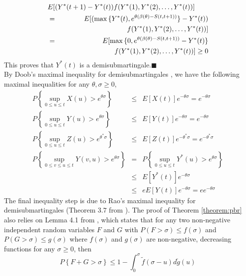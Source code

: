 \documentclass[letterpaper]{IEEEtran}
\begin{document}
\small 
\begin{eqnarray*}
\lefteqn{E[(Y^*(t+1) - Y^*(t))f(Y^*(1), Y^*(2), \ldots, Y^*(t))]} \\
&=& E[(\max{\{Y^*(t),e^{\theta (\beta(\theta) - S(t,t+1))}\}} - Y^*(t))\\
&& \ \ \ \ \ \ \ \ \ \ \ \ \ \ \ \ \ \ \ \ \ \ \ \ \ \ \ \ f(Y^*(1), Y^*(2), \ldots, Y^*(t))]\\
&=& E[\max{\{0,e^{\theta (\beta(\theta) - S(t,t+1))}-Y^*(t)\}} \\
&&  \ \ \ \ \ \ \ \ \ \ \ \ \ \ \ \ \ \ \ \ \ \ \ f(Y^*(1), Y^*(2), \ldots, Y^*(t))] \ge 0
\end{eqnarray*}
\normalsize
This proves that $Y^*(t)$ is a demisubmartingale.$\blacksquare$\\
By Doob's maximal inequality for demisubmartingales \cite{chris:2003,rao:2007}, we have the following maximal inequalities for any $\theta, \sigma \ge 0$,
\small
\begin{eqnarray}
P\left\{ \sup_{0 \le u \le t}X(u) > e^{\theta \sigma} \right\} &\le& E[X(t)]e^{-\theta \sigma} = e^{-\theta \sigma} \label{doobX}\\
P\left\{ \sup_{0 \le u \le t}Y(u) > e^{\theta \sigma} \right\} &\le& E[Y(t)]e^{-\theta \sigma} = e^{-\theta \sigma} \label{doobY}\\
P\left\{ \sup_{0 \le u \le t}Z(u) > e^{\theta^* \sigma} \right\} &\le& E[Z(t)]e^{-\theta^* \sigma} = e^{-\theta^* \sigma} \label{doobZ}\\
P\left\{ \sup_{0 \le v \le u \le t}Y(v,u) > e^{\theta \sigma} \right\} &=& P\left\{ \sup_{0 \le u \le t}Y^*(u) > e^{\theta \sigma} \right\} \nonumber \\
&\le& E[Y^*(t)]e^{-\theta \sigma} \nonumber \\
&\le& eE[Y(t)]e^{-\theta \sigma} = ee^{-\theta \sigma} \label{doobY*}
\end{eqnarray}
\normalsize
The final inequality step is due to Rao's maximal inequality for demisubmartingales (Theorem $3.7$ from \cite{rao:2007}). The proof of Theorem \ref{theorem:pbr} also relies on Lemma 4.1 from \cite{yuming:2006}, which states that for any two non-negative independent random variables $F$ and $G$ with $P(F > \sigma) \le f(\sigma)$ and $P(G > \sigma) \le g(\sigma)$ where $f(\sigma)$ and $g(\sigma)$ are non-negative, decreasing functions for any $\sigma \ge 0$, then 
\begin{equation}
P\left\{F + G > \sigma \right\} \le 1-\int_{0}^{\sigma}{\tilde{f}(\sigma-u)d\tilde{g}(u)}  
\label{speffenv1} 
\end{equation}
\end{document}
